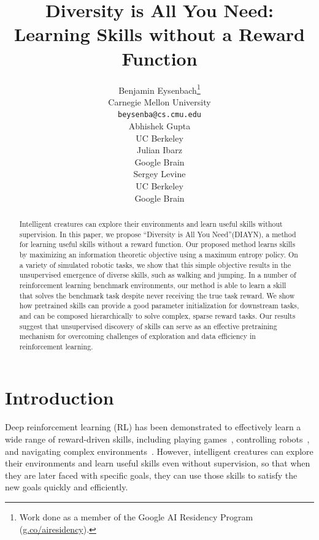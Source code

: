 \documentclass{article} %
\title{Diversity is All You Need:\\Learning Skills without a Reward Function}
\author{
  Benjamin Eysenbach\thanks{Work done as a member of the Google AI Residency Program (\url{g.co/airesidency}).} \\
  Carnegie Mellon University\\
  \texttt{beysenba@cs.cmu.edu} \\
  \And
  Abhishek Gupta \\
  UC Berkeley\\
  \And
  Julian Ibarz \\
  Google Brain \\
  \And
  Sergey Levine \\
  UC Berkeley \\
  Google Brain \\
}
\theoremstyle{questionstyle}\newtheorem{question}{Question}
\begin{document}
\maketitle

\begin{abstract}
Intelligent creatures can explore their environments and learn useful skills without supervision.
In this paper, we propose ``Diversity is All You Need''(DIAYN), a method for learning useful skills without a reward function. Our proposed method learns skills by maximizing an information theoretic objective using a maximum entropy policy. On a variety of simulated robotic tasks, we show that this simple objective results in the unsupervised emergence of diverse skills, such as walking and jumping. In a number of reinforcement learning benchmark environments, our method is able to learn a skill that solves the benchmark task despite never receiving the true task reward.
We show how pretrained skills can provide a good parameter initialization for downstream tasks, and can be composed hierarchically to solve complex, sparse reward tasks. Our results suggest that unsupervised discovery of skills can serve as an effective pretraining mechanism for overcoming challenges of exploration and data efficiency in reinforcement learning.
\end{abstract}

\section{Introduction}
\label{sec:introduction}

Deep reinforcement learning (RL) has been demonstrated to effectively learn a wide range of reward-driven skills, including playing games~\citep{mnih2013playing,silver2016mastering}, controlling robots~\citep{gu2017deep,schulman2015high}, and navigating complex environments~\citep{ai2thor,mirowski2016learning}. However, intelligent creatures can explore their environments and learn useful skills even without supervision, so that when they are later faced with specific goals, they can use those skills to satisfy the new goals quickly and efficiently.
\end{document}
